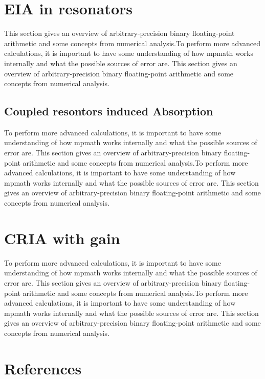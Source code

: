 \section{EIA in resonators} 
 
  This section gives an overview of arbitrary-precision binary floating-point arithmetic and some concepts from numerical analysis.To perform more advanced calculations, it is important to have some understanding of how mpmath works internally and what the possible sources of error are. This section gives an overview of arbitrary-precision binary floating-point arithmetic and some concepts from numerical analysis.
  
\subsection{Coupled resontors induced Absorption}

To perform more advanced calculations, it is important to have some understanding of how mpmath works internally and what the possible sources of error are. This section gives an overview of arbitrary-precision binary floating-point arithmetic and some concepts from numerical analysis.To perform more advanced calculations, it is important to have some understanding of how mpmath works internally and what the possible sources of error are. This section gives an overview of arbitrary-precision binary floating-point arithmetic and some concepts from numerical analysis.
\section{CRIA with gain}
To perform more advanced calculations, it is important to have some understanding of how mpmath works internally and what the possible sources of error are. This section gives an overview of arbitrary-precision binary floating-point arithmetic and some concepts from numerical analysis.To perform more advanced calculations, it is important to have some understanding of how mpmath works internally and what the possible sources of error are. This section gives an overview of arbitrary-precision binary floating-point arithmetic and some concepts from numerical analysis.


\newpage
\section*{References}

